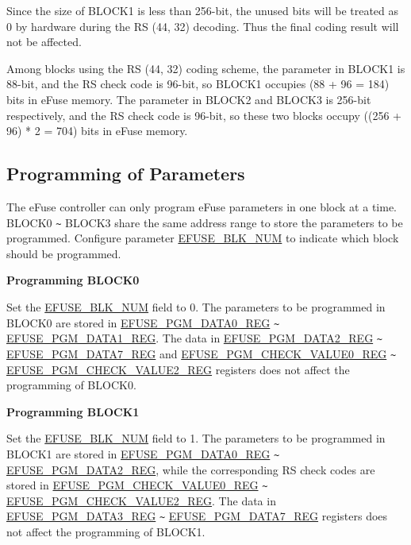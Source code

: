 \documentclass[main\_\_EN.tex]{subfiles}
\begin{document}
Since the size of BLOCK1 is less than 256-bit, the unused bits will be treated as 0 by hardware during the RS (44, 32) decoding. Thus the final coding result will not be affected.

Among blocks using the RS (44, 32) coding scheme, the parameter in BLOCK1 is 88-bit, and the RS check code is 96-bit, so BLOCK1 occupies (88 + 96 = 184) bits in eFuse memory. The parameter in BLOCK2 and BLOCK3 is 256-bit respectively, and the RS check code is 96-bit, so these two blocks occupy ((256 + 96) * 2 = 704) bits in eFuse memory.


\subsection{Programming of Parameters}
\label{sec:efuse-software-programming-para}

The eFuse controller can only program eFuse parameters in one block at a time. BLOCK0 \verb+~+ BLOCK3 share the same address range to store the parameters to be programmed. Configure parameter \hyperref[fielddesc:EFUSEBLKNUM]{EFUSE\_BLK\_NUM} to indicate which block should be programmed.

{\bfseries Programming BLOCK0}

Set the \hyperref[fielddesc:EFUSEBLKNUM]{EFUSE\_BLK\_NUM} field to 0. The parameters to be programmed in BLOCK0 are stored in \hyperref[regdesc:EFUSEPGMDATA0REG]{EFUSE\_PGM\_DATA0\_REG} \verb+~+ \hyperref[regdesc:EFUSEPGMDATA1REG]{EFUSE\_PGM\_DATA1\_REG}. The data in \hyperref[regdesc:EFUSEPGMDATA6REG]{EFUSE\_PGM\_DATA2\_REG} \verb+~+ \hyperref[regdesc:EFUSEPGMDATA7REG]{EFUSE\_PGM\_DATA7\_REG} and \hyperref[regdesc:EFUSEPGMCHECKVALUE0REG]{EFUSE\_PGM\_CHECK\_VALUE0\_REG} \verb+~+ \hyperref[regdesc:EFUSEPGMCHECKVALUE2REG]{EFUSE\_PGM\_CHECK\_VALUE2\_REG} registers does not affect the programming of BLOCK0.

{\bfseries Programming BLOCK1}

Set the \hyperref[fielddesc:EFUSEBLKNUM]{EFUSE\_BLK\_NUM} field to 1. The parameters to be programmed in BLOCK1 are stored in \hyperref[regdesc:EFUSEPGMDATA0REG]{EFUSE\_PGM\_DATA0\_REG} \verb+~+ \hyperref[regdesc:EFUSEPGMDATA5REG]{EFUSE\_PGM\_DATA2\_REG}, while the corresponding RS check codes are stored in \hyperref[regdesc:EFUSEPGMCHECKVALUE0REG]{EFUSE\_PGM\_CHECK\_VALUE0\_REG} \verb+~+ \hyperref[regdesc:EFUSEPGMCHECKVALUE2REG]{EFUSE\_PGM\_CHECK\_VALUE2\_REG}. The data in \hyperref[regdesc:EFUSEPGMDATA6REG]{EFUSE\_PGM\_DATA3\_REG} \verb+~+ \hyperref[regdesc:EFUSEPGMDATA7REG]{EFUSE\_PGM\_DATA7\_REG} registers does not affect the programming of BLOCK1.
\end{document}
